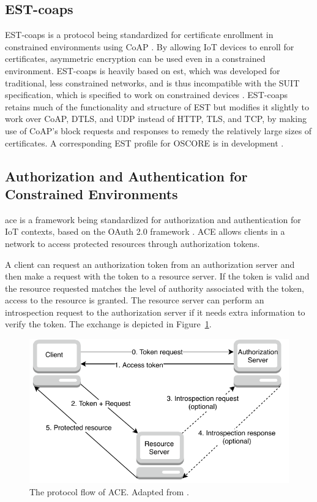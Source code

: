 \documentclass[0-thesis.tex]{subfiles}
\begin{document}
\subsection{EST-coaps}
\label{ssec:est-coaps}
EST-coaps is a protocol being standardized for certificate enrollment in constrained
environments using CoAP \parencite{est-coaps}. By allowing IoT devices to enroll for
certificates, asymmetric encryption can be used even in a constrained environment.
EST-coaps is heavily based on \gls{est}, which was developed for traditional, less
constrained networks, and is thus incompatible with the SUIT specification, which is
specified to work on constrained devices \parencite{rfc7030}. EST-coaps retains much of
the functionality and structure of EST but modifies it slightly to work over CoAP, DTLS,
and UDP instead of HTTP, TLS, and TCP, by making use of CoAP's block requests and
responses to remedy the relatively large sizes of certificates. A corresponding EST
profile for OSCORE is in development \parencite{est-oscore}.

\subsection{Authorization and Authentication for Constrained Environments}
\label{ssec:ace}
\gls{ace} is a framework being standardized for authorization and authentication for IoT
contexts, based on the OAuth 2.0 framework \parencite{ace}. ACE allows clients in a
network to access protected resources through authorization tokens. 

A client can request an authorization token from an authorization server and then make a
request with the token to a resource server. If the token is valid and the resource
requested matches the level of authority associated with the token, access to the resource
is granted. The resource server can perform an introspection request to the authorization
server if it needs extra information to verify the token. The exchange is depicted in
Figure~\ref{fig:ace-flow}.

\begin{figure}
    \caption[The protocol flow of ACE.]
        {The protocol flow of ACE. Adapted from \parencite{ace}.}
    \label{fig:ace-flow}
    \includegraphics{images/ace.pdf}
\end{figure}
\end{document}
